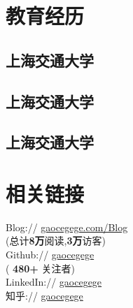 \documentclass[]{deedy-resume-openfont}
\begin{document}
%
%
\lastupdated


%
%

\begin{minipage}[t]{0.3\textwidth}


\section{教育经历}
\sectionsep

\subsection{上海交通大学}
\sectionsep

\subsection{上海交通大学}
\sectionsep

\subsection{上海交通大学}
\sectionsep


\section{相关链接}
\sectionsep
Blog://  \href{http://gaocegege.com/Blog}{gaocegege.com/Blog} \\
{(总计\textbf{8万}阅读,\textbf{3万}访客)} \\
Github:// \href{https://github.com/gaocegege}{gaocegege} \\
{(\textbf{ 480+ }关注者)} \\
LinkedIn://  \href{https://www.linkedin.com/in/gaocegege}{gaocegege} \\
知乎:// \href{https://www.zhihu.com/people/gaocegege}{gaocegege} \\
\sectionsep


\end{minipage}
\end{document}
